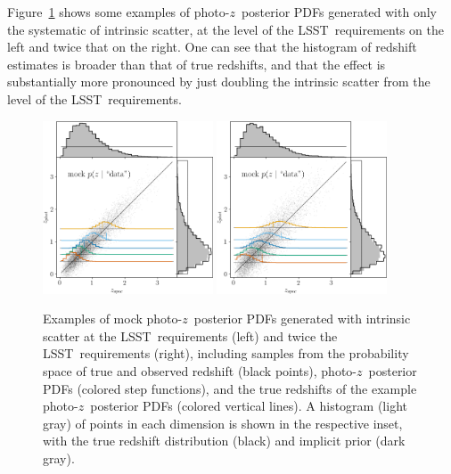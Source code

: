 \documentclass[iop]{emulateapj}
\newcommand{\todo}[3]{{\color{#2}\emph{#1}: #3}}
\newcommand{\aim}[1]{\todo{AIM}{red}{#1}}
\newcommand{\Fig}[1]{Figure~\ref{#1}}
\newcommand{\project}[1]{\textsc{#1}}
\newcommand{\lsst}{\project{LSST}}
\newcommand{\pz}{photo-$z$}
\newcommand{\pzpdf}{\pz\ posterior PDF}%
\begin{document}
\Fig{fig:pzs-scatter} shows some examples of \pzpdf s generated with only the systematic of intrinsic scatter, at the level of the \lsst\ requirements on the left and twice that on the right.
One can see that the histogram of redshift estimates is broader than that of true redshifts, and that the effect is substantially more pronounced by just doubling the intrinsic scatter from the level of the \lsst\ requirements.

\begin{figure}
	\begin{center}
	\includegraphics[width=0.45\textwidth]{figures/chippr/single_varsigmas-mega_scatter.png}
	\includegraphics[width=0.45\textwidth]{figures/chippr/thesis_hivarsig-mega_scatter.png}
	\caption{
		Examples of mock \pzpdf s generated with intrinsic scatter at the \lsst\ requirements (left) and twice the \lsst\ requirements (right), including samples from the probability space of true and observed redshift (black points), \pzpdf s (colored step functions), and the true redshifts of the example \pzpdf s (colored vertical lines).
		A histogram (light gray) of points in each dimension is shown in the respective inset, with the true redshift distribution (black) and implicit prior (dark gray).
	}
	\label{fig:pzs-scatter}
	\end{center}
\end{figure}
\end{document}
